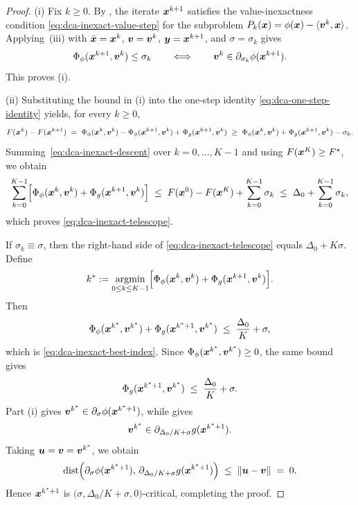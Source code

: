 \begin{proof}
(i) Fix $k\ge0$. By , the iterate
$\bm{x}^{k+1}$ satisfies the value-inexactness condition
\eqref{eq:dca-inexact-value-step} for the subproblem
$P_k(\bm{x})=\phi(\bm{x})-\langle\bm{v}^k,\bm{x}\rangle$. Applying
\,(iii) with
$\bar{\bm{x}}=\bm{x}^k$, $\bm{v}=\bm{v}^k$, $\bm{y}=\bm{x}^{k+1}$, and
$\sigma=\sigma_k$ gives
\[
    \Phi_\phi(\bm{x}^{k+1},\bm{v}^k)\le\sigma_k
    \qquad\Longleftrightarrow\qquad
    \bm{v}^k\in\partial_{\sigma_k}\phi(\bm{x}^{k+1}).
\]
This proves (i).

(ii) Substituting the bound in (i) into the one-step identity
\eqref{eq:dca-one-step-identity} yields, for every $k\ge0$,
\begin{equation}
    F(\bm{x}^k)-F(\bm{x}^{k+1})
    \;=\;
    \Phi_\phi(\bm{x}^k,\bm{v}^k)
    -\Phi_\phi(\bm{x}^{k+1},\bm{v}^k)
    +\Phi_g(\bm{x}^{k+1},\bm{v}^k)
    \;\ge\;
    \Phi_\phi(\bm{x}^k,\bm{v}^k)
    +\Phi_g(\bm{x}^{k+1},\bm{v}^k)
    -\sigma_k .
    \label{eq:dca-inexact-descent}
\end{equation}
Summing~\eqref{eq:dca-inexact-descent} over $k=0,\ldots,K-1$
and using $F(\bm{x}^K)\ge F^\star$, we obtain
\[
    \sum_{k=0}^{K-1}
    \Bigl[
        \Phi_\phi(\bm{x}^k,\bm{v}^k)+\Phi_g(\bm{x}^{k+1},\bm{v}^k)
    \Bigr]
    \;\le\;
    F(\bm{x}^0)-F(\bm{x}^K)+\sum_{k=0}^{K-1}\sigma_k
    \;\le\;
    \Delta_0+\sum_{k=0}^{K-1}\sigma_k,
\]
which proves \eqref{eq:dca-inexact-telescope}.

If $\sigma_k\equiv\sigma$, then the right-hand side of
\eqref{eq:dca-inexact-telescope} equals $\Delta_0+K\sigma$. Define
\[
    k^*
    :=
    \operatorname*{\mathrm{argmin}}_{0\le k\le K-1}
    \Bigl[
        \Phi_\phi(\bm{x}^k,\bm{v}^k)+\Phi_g(\bm{x}^{k+1},\bm{v}^k)
    \Bigr].
\]
Then
\[
    \Phi_\phi(\bm{x}^{k^*},\bm{v}^{k^*})
    +\Phi_g(\bm{x}^{k^*+1},\bm{v}^{k^*})
    \;\le\;
    \frac{\Delta_0}{K}+\sigma,
\]
which is \eqref{eq:dca-inexact-best-index}. Since
$\Phi_\phi(\bm{x}^{k^*},\bm{v}^{k^*})\ge0$, the same bound gives
\[
    \Phi_g(\bm{x}^{k^*+1},\bm{v}^{k^*})
    \;\le\;
    \frac{\Delta_0}{K}+\sigma .
\]
Part (i) gives
$\bm{v}^{k^*}\in\partial_\sigma\phi(\bm{x}^{k^*+1})$, while
 gives
\[
    \bm{v}^{k^*}\in
    \partial_{\Delta_0/K+\sigma}g(\bm{x}^{k^*+1}).
\]
Taking $\bm{u}=\bm{v}=\bm{v}^{k^*}$, we obtain
\[
    \operatorname{dist}
    \Bigl(
        \partial_{\sigma}\phi(\bm{x}^{k^*+1}),\,
        \partial_{\Delta_0/K+\sigma}g(\bm{x}^{k^*+1})
    \Bigr)
    \;\le\;
    \|\bm{u}-\bm{v}\|
    \;=\;
    0.
\]
Hence $\bm{x}^{k^*+1}$ is
$\bigl(\sigma,\Delta_0/K+\sigma,0\bigr)$-critical, completing the proof.
\end{proof}

